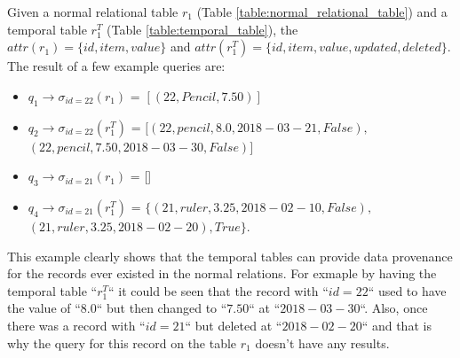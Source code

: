 		\begin{example}
			Given a normal relational table $r_1$ (Table \ref{table:normal_relational_table}) and a temporal table $r_1^T$ (Table \ref{table:temporal_table}), the $attr(r_1) = \{id, item, value\}$ and $attr(r_1^T)= \{id, item, value, updated, deleted\}$. The result of a few example queries are:

			\begin{itemize}
				\item \textbf{$q_1 \to \sigma_{id = 22}(r_1)$} = $[(22,Pencil,7.50)]$
				\item \textbf{$q_2 \to \sigma_{id = 22}(r_1^T)$} = $[(22,pencil,8.0,2018-03-21,False),$ \\ $(22,pencil,7.50,2018-03-30,False)]$
				\item \textbf{$q_3 \to \sigma_{id = 21}(r_1)$} = []
				\item \textbf {$q_4 \to \sigma_{id = 21}(r_1^T)$} = $\{(21,ruler,3.25,2018-02-10,False),$ \\ $(21,ruler,3.25,2018-02-20), True\}$.
			\end{itemize}
			This example clearly shows that the temporal tables can provide data provenance for the records ever existed in the normal relations. For exmaple by having the temporal table ``$r_1^T$`` it could be seen that the record with ``$id = 22$`` used to have the value of ``$8.0$`` but then changed to ``$7.50$`` at ``$2018-03-30$``. Also, once there was a record with ``$id = 21$`` but deleted at ``$2018-02-20$`` and that is why the query for this record on the table $r_1$ doesn't have any results.
		\label{example:temporal_table}
		\end{example}

